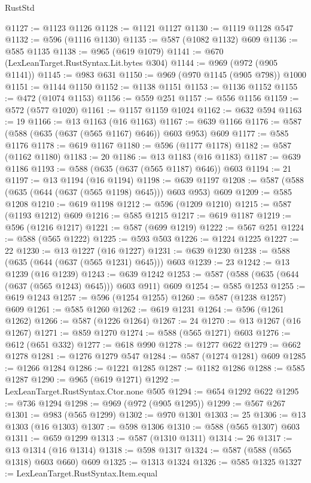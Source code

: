 \begin{lexlean}{RustStd}
\begin{coremodule}
@1127 := @1123 @1126
@1128 := @1121 @1127
@1130 := @1119 @1128 @547
@1132 := @596 (@1116 @1130)
@1135 := @587 (@1082 @1132) @609
@1136 := @585 @1135
@1138 := @965 (@619 @1079)
@1141 := @670 (LexLeanTarget.RustSyntax.Lit.bytes @304)
@1144 := @969 (@972 (@905 @1141))
@1145 := @983 @631
@1150 := @969 (@970 @1145 (@905 @798)) @1000
@1151 := @1144 @1150
@1152 := @1138 @1151
@1153 := @1136 @1152
@1155 := @472 (@1074 @1153)
@1156 := @559 @251
@1157 := @556 @1156
@1159 := @572 (@577 @1020)
@1161 := @1157 @1159 @1024
@1162 := @632 @594
@1163 := 19
@1166 := @13 @1163 (@16 @1163)
@1167 := @639 @1166
@1176 := @587 (@588 (@635 (@637 (@565 @1167) @646)) @603 @953) @609
@1177 := @585 @1176
@1178 := @619 @1167
@1180 := @596 (@1177 @1178)
@1182 := @587 (@1162 @1180)
@1183 := 20
@1186 := @13 @1183 (@16 @1183)
@1187 := @639 @1186
@1193 := @588 (@635 (@637 (@565 @1187) @646)) @603
@1194 := 21
@1197 := @13 @1194 (@16 @1194)
@1198 := @639 @1197
@1208 := @587 (@588 (@635 (@644 (@637 (@565 @1198) @645))) @603 @953) @609
@1209 := @585 @1208
@1210 := @619 @1198
@1212 := @596 (@1209 @1210)
@1215 := @587 (@1193 @1212) @609
@1216 := @585 @1215
@1217 := @619 @1187
@1219 := @596 (@1216 @1217)
@1221 := @587 (@699 @1219)
@1222 := @567 @251
@1224 := @588 (@565 @1222)
@1225 := @593 @503
@1226 := @1224 @1225
@1227 := 22
@1230 := @13 @1227 (@16 @1227)
@1231 := @639 @1230
@1238 := @588 (@635 (@644 (@637 (@565 @1231) @645))) @603
@1239 := 23
@1242 := @13 @1239 (@16 @1239)
@1243 := @639 @1242
@1253 := @587 (@588 (@635 (@644 (@637 (@565 @1243) @645))) @603 @911) @609
@1254 := @585 @1253
@1255 := @619 @1243
@1257 := @596 (@1254 @1255)
@1260 := @587 (@1238 @1257) @609
@1261 := @585 @1260
@1262 := @619 @1231
@1264 := @596 (@1261 @1262)
@1266 := @587 (@1226 @1264)
@1267 := 24
@1270 := @13 @1267 (@16 @1267)
@1271 := @859 @1270
@1274 := @588 (@565 @1271) @603
@1276 := @612 (@651 @332)
@1277 := @618 @990
@1278 := @1277 @622
@1279 := @662 @1278
@1281 := @1276 @1279 @547
@1284 := @587 (@1274 @1281) @609
@1285 := @1266 @1284
@1286 := @1221 @1285
@1287 := @1182 @1286
@1288 := @585 @1287
@1290 := @965 (@619 @1271)
@1292 := LexLeanTarget.RustSyntax.Ctor.none @505
@1294 := @654 @1292 @622
@1295 := @736 @1294
@1298 := @969 (@972 (@905 @1295))
@1299 := @567 @267
@1301 := @983 (@565 @1299)
@1302 := @970 @1301
@1303 := 25
@1306 := @13 @1303 (@16 @1303)
@1307 := @598 @1306
@1310 := @588 (@565 @1307) @603
@1311 := @659 @1299
@1313 := @587 (@1310 @1311)
@1314 := 26
@1317 := @13 @1314 (@16 @1314)
@1318 := @598 @1317
@1324 := @587 (@588 (@565 @1318) @603 @660) @609
@1325 := @1313 @1324
@1326 := @585 @1325
@1327 := LexLeanTarget.RustSyntax.Item.equal

\end{coremodule}
\end{lexlean}
